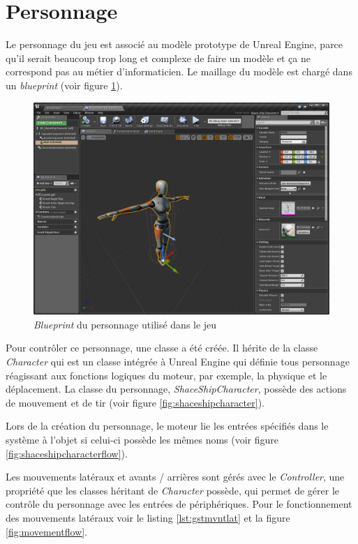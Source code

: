 \documentclass[11pt, a4paper, oneside]{article}
\begin{document}
\newpage
\section{Personnage}
Le personnage du jeu est associé au modèle prototype de Unreal Engine, parce qu'il serait beaucoup trop long et complexe de faire un modèle et ça ne correspond pas au métier d'informaticien. Le maillage du modèle est chargé dans un \emph{blueprint} (voir figure \ref{fig:characterbp}).

\begin{figure}[htp]
	\begin{center}
	\includegraphics[width=\textwidth]{characterBP}
	\caption{\emph{Blueprint} du personnage utilisé dans le jeu}
	\label{fig:characterbp}
	\end{center}
\end{figure}

Pour contrôler ce personnage, une classe a été créée. Il hérite de la classe \emph{Character} qui est un classe intégrée à Unreal Engine qui définie tous personnage réagissant aux fonctions logiques du moteur, par exemple, la physique et le déplacement. La classe du personnage, \emph{ShaceShipCharacter}, possède des actions de mouvement et de tir (voir figure \ref{fig:shaceshipcharacter}).

Lors de la création du personnage, le moteur lie les entrées spécifiés dans le système à l'objet si celui-ci possède les mêmes noms (voir figure \ref{fig:shaceshipcharacterflow}).

Les mouvements latéraux et avants / arrières sont gérés avec le \emph{Controller}, une propriété que les classes héritant de \emph{Character} possède, qui permet de gérer le contrôle du personnage avec les entrées de périphériques. Pour le fonctionnement des mouvements latéraux voir le listing \ref{lst:gstmvntlat} et la figure \ref{fig:movementflow}.
\end{document}
